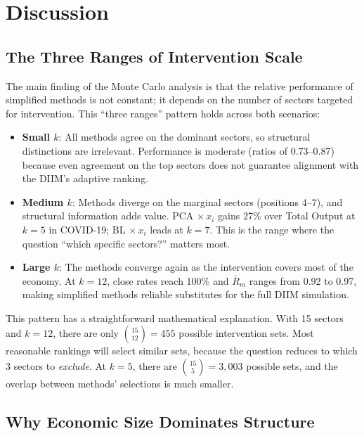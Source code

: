 \chapter{Discussion}

\section{The Three Ranges of Intervention Scale}

The main finding of the Monte Carlo analysis is that the relative performance of simplified methods is not constant; it depends on the number of sectors targeted for intervention. This ``three ranges'' pattern holds across both scenarios:

\begin{itemize}
    \item \textbf{Small $k$}: All methods agree on the dominant sectors, so structural distinctions are irrelevant. Performance is moderate (ratios of 0.73--0.87) because even agreement on the top sectors does not guarantee alignment with the DIIM's adaptive ranking.

    \item \textbf{Medium $k$}: Methods diverge on the marginal sectors (positions 4--7), and structural information adds value. PCA $\times\, x_i$ gains 27\% over Total Output at $k = 5$ in COVID-19; BL $\times\, x_i$ leads at $k = 7$. This is the range where the question ``which specific sectors?'' matters most.

    \item \textbf{Large $k$}: The methods converge again as the intervention covers most of the economy. At $k = 12$, close rates reach 100\% and $\bar{R}_m$ ranges from 0.92 to 0.97, making simplified methods reliable substitutes for the full DIIM simulation.
\end{itemize}

This pattern has a straightforward mathematical explanation. With 15 sectors and $k = 12$, there are only $\binom{15}{12} = 455$ possible intervention sets. Most reasonable rankings will select similar sets, because the question reduces to which 3 sectors to \emph{exclude}. At $k = 5$, there are $\binom{15}{5} = 3{,}003$ possible sets, and the overlap between methods' selections is much smaller.


\section{Why Economic Size Dominates Structure}


